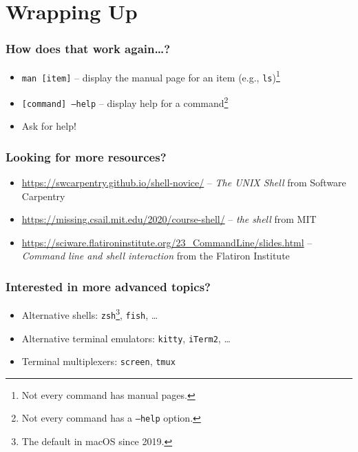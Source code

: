 \documentclass[aspectratio=169]{beamer}
\begin{document}
\section{Wrapping Up}

\frame{\sectionpage}

\begin{frame}
	\frametitle{How does that work again\dots?}
	\begin{itemize}
		\item \texttt{man [item]} -- display the manual page for an item (e.g., \texttt{ls})\footnote{Not every command has manual pages.}
		\item \texttt{[command] --help} -- display help for a command\footnote{Not every command has a \texttt{--help} option.}
		\item Ask for help!
	\end{itemize}
\end{frame}

\begin{frame}
	\frametitle{Looking for more resources?}
	\begin{itemize}
		\item \url{https://swcarpentry.github.io/shell-novice/} -- \textit{The UNIX Shell} from Software Carpentry
		\item \url{https://missing.csail.mit.edu/2020/course-shell/} -- \textit{the shell} from MIT
		\item \url{https://sciware.flatironinstitute.org/23_CommandLine/slides.html} -- \textit{Command line and shell interaction} from the Flatiron Institute
	\end{itemize}
\end{frame}

\begin{frame}
	\frametitle{Interested in more advanced topics?}
	\begin{itemize}
		\item Alternative shells: \texttt{zsh}\footnote{The default in macOS since 2019.}, \texttt{fish}, \dots
		\item Alternative terminal emulators: \texttt{kitty}, \texttt{iTerm2}, \dots
		\item Terminal multiplexers: \texttt{screen}, \texttt{tmux}
	\end{itemize}
\end{frame}
\end{document}
